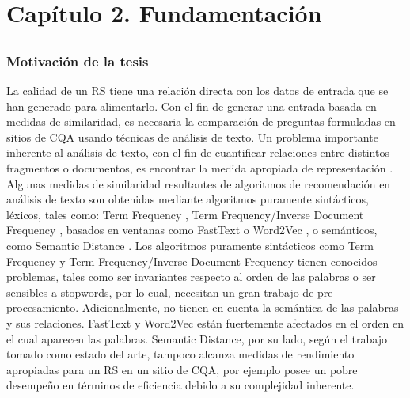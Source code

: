 \chapter*{Capítulo 2. \textbf{Fundamentación}}\label{ch:fundamentacion}

\section*{}
\addtocounter{section}{1}
\setcounter{subsection}{0}

\subsection{Motivación de la tesis}
 La calidad de un RS tiene una relación directa con los datos de entrada que se han generado para alimentarlo. Con el fin de generar una entrada basada en medidas de similaridad, es necesaria la comparación de preguntas formuladas en sitios de CQA usando técnicas de análisis de texto. Un problema importante inherente al análisis de texto, con el fin de cuantificar relaciones entre distintos fragmentos o documentos, es encontrar la medida apropiada de representación \citep{gonzalez2017comparative}. Algunas medidas de similaridad resultantes de algoritmos de recomendación en análisis de texto son obtenidas mediante algoritmos puramente sintácticos, léxicos, tales como: Term Frequency \citep{salton5mcgill}, Term Frequency/Inverse Document Frequency \citep{baeza1999modern}, basados en ventanas como FastText \citep{joulin2016fasttext} o Word2Vec \citep{mikolov2013efficient}, o semánticos, como Semantic Distance \citep{li2006sentence}. Los algoritmos puramente sintácticos como Term Frequency y Term Frequency/Inverse Document Frequency tienen conocidos problemas, tales como ser invariantes respecto al orden de las palabras o ser sensibles a stopwords, por lo cual, necesitan un gran trabajo de pre-procesamiento. Adicionalmente, no tienen en cuenta la semántica de las palabras y sus relaciones. FastText y Word2Vec están fuertemente afectados en el orden en el cual aparecen las palabras. Semantic Distance, por su lado, según el trabajo tomado como estado del arte, tampoco alcanza medidas de rendimiento apropiadas para un RS en un sitio de CQA, por ejemplo posee un pobre desempeño en términos de eficiencia debido a su complejidad inherente.

